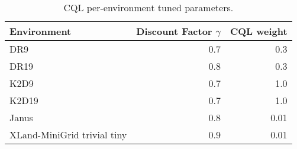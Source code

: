 \begin{table}[ht]
    \label{tab:}
    \begin{center}
 \caption{CQL per-environment tuned parameters.}
    \begin{small}
    \begin{adjustbox}{max width=\columnwidth}
		\begin{tabular}{l|rr}
		\toprule
	\textbf{Environment} & \textbf{Discount Factor $\gamma$} & \textbf{CQL weight} \\
\midrule
    DR9 & 0.7 & 0.3\\
DR19 & 0.8 & 0.3 \\
K2D9 & 0.7 & 1.0 \\
K2D19 & 0.7 & 1.0 \\
Janus & 0.8 & 0.01 \\
XLand-MiniGrid trivial tiny & 0.9 & 0.01 \\
\bottomrule
\end{tabular}
        \end{adjustbox}
    \end{small}
    \end{center}
    \vskip -0.1in
\end{table}
    